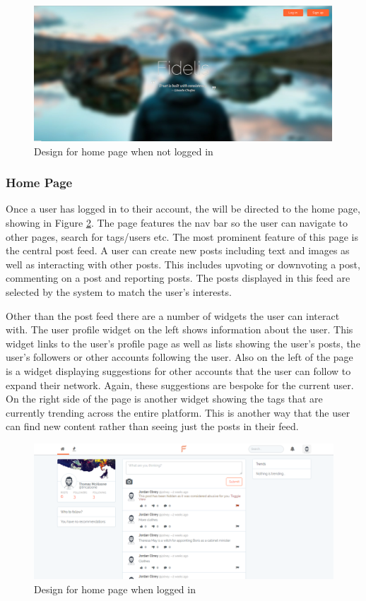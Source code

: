 \begin{figure}[H]
\centering
\includegraphics[height=2in]{Images/Design/home_unauthorised}
\caption{Design for home page when not logged in}
\label{fig:home_unauthorised}
\end{figure}

\subsubsection{Home Page}
Once a user has logged in to their account, the will be directed to the home page, showing in Figure \ref{fig:home_authorised}. The page features the nav bar so the user can navigate to other pages, search for tags/users etc. The most prominent feature of this page is the central post feed. A user can create new posts including text and images as well as interacting with other posts. This includes upvoting or downvoting a post, commenting on a post and reporting posts. The posts displayed in this feed are selected by the system to match the user's interests.

Other than the post feed there are a number of widgets the user can interact with. The user profile widget on the left shows information about the user. This widget links to the user's profile page as well as lists showing the user's posts, the user's followers or other accounts following the user. Also on the left of the page is a widget displaying suggestions for other accounts that the user can follow to expand their network. Again, these suggestions are bespoke for the current user. On the right side of the page is another widget showing the tags that are currently trending across the entire platform. This is another way that the user can find new content rather than seeing just the posts in their feed.

\begin{figure}[H]
\centering
\includegraphics[height=2in]{Images/Design/home_authorised}
\caption{Design for home page when logged in}
\label{fig:home_authorised}
\end{figure}

